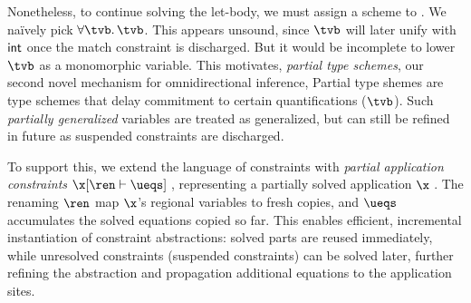 \documentclass[acmsmall,screen,nonacm]{acmart}
\begin{document}

Nonetheless, to continue solving the let-body, we must assign a scheme to
. We na\"ively pick $\tfor \tvb \tvb$. This appears unsound, since
$\tvb$ will later unify with $\mathsf{int}$ once the match constraint is discharged.
But it would be incomplete to lower $\tvb$ as a monomorphic variable.
%
This motivates, \emph{partial type schemes}, our second novel mechanism for
omnidirectional inference, Partial type shemes are type schemes that delay
commitment to certain quantifications (\eg $\tvb$). Such \emph{partially
generalized} variables are treated as generalized, but can still be refined
in future as suspended constraints are discharged.


To support this, we extend the language of constraints with \emph{partial
application constraints} $\cpapp \x \ren \ueqs \t$, representing a partially
solved application $\capp \x \t$. The renaming $\ren$ map $\x$'s regional
variables to fresh copies, and $\ueqs$ accumulates the solved equations copied
so far. This enables efficient, incremental instantiation of constraint
abstractions: solved parts are reused immediately, while unresolved
constraints (\ie suspended constraints) can be solved later, further refining
the abstraction and propagation additional equations to the application sites.
\end{document}

